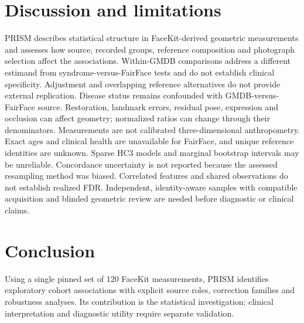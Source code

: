 \documentclass[11pt]{article}
\begin{document}
\section{Discussion and limitations}
PRISM describes statistical structure in FaceKit-derived geometric measurements and assesses how source, recorded groups, reference composition and photograph selection affect the associations. Within-GMDB comparisons address a different estimand from syndrome-versus-FairFace tests and do not establish clinical specificity. Adjustment and overlapping reference alternatives do not provide external replication.
Disease status remains confounded with GMDB-versus-FairFace source. Restoration, landmark errors, residual pose, expression and occlusion can affect geometry; normalized ratios can change through their denominators. Measurements are not calibrated three-dimensional anthropometry. Exact ages and clinical health are unavailable for FairFace, and unique reference identities are unknown. Sparse HC3 models and marginal bootstrap intervals may be unreliable. Concordance uncertainty is not reported because the assessed resampling method was biased. Correlated features and shared observations do not establish realized FDR. Independent, identity-aware samples with compatible acquisition and blinded geometric review are needed before diagnostic or clinical claims.
\section{Conclusion}
Using a single pinned set of 120 FaceKit measurements, PRISM identifies exploratory cohort associations with explicit source roles, correction families and robustness analyses. Its contribution is the statistical investigation; clinical interpretation and diagnostic utility require separate validation.
\end{document}
